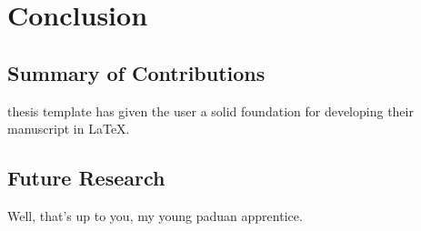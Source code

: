 \chapter{Conclusion}
	\label{chapter:conclusion}%

\section{Summary of Contributions}

 thesis template has given the user a solid foundation for developing their manuscript in \LaTeX.

\section{Future Research}

Well, that's up to you, my young paduan apprentice.

